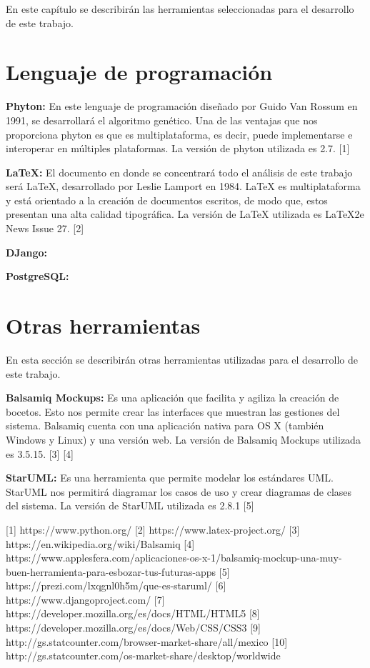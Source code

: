 \label{sec:seleccionHerramientas}
	
	En este capítulo se describirán las herramientas seleccionadas para el desarrollo de este trabajo. 
	
	\section{Lenguaje de programación}
		\textbf{Phyton:} En este lenguaje de programación diseñado por Guido Van Rossum en 1991, se desarrollará el algoritmo genético. Una de las ventajas que nos proporciona phyton es que es multiplataforma, es decir, puede implementarse e interoperar en múltiples plataformas. La versión de phyton utilizada es 2.7. [1] 
	
		\textbf{LaTeX:} El documento en donde se concentrará todo el análisis de este trabajo será LaTeX, desarrollado por Leslie Lamport en 1984. LaTeX es multiplataforma y está orientado a la creación de documentos escritos, de modo que, estos  presentan una alta calidad tipográfica. La versión de LaTeX utilizada es LaTeX2e News Issue 27. [2]
		
		\textbf{DJango:}
		
		\textbf{PostgreSQL:}
	
	\section{Otras herramientas}
		En esta sección se describirán otras herramientas utilizadas para el desarrollo de este trabajo.
		
		\textbf{Balsamiq Mockups:} Es una aplicación que facilita y agiliza la creación de bocetos. Esto nos permite crear las interfaces que muestran las gestiones del sistema. Balsamiq cuenta con una aplicación nativa para OS X (también Windows y Linux) y una versión web. La versión de Balsamiq Mockups utilizada es 3.5.15. [3] [4]
		
		\textbf{StarUML:} Es una herramienta que permite modelar los estándares UML. StarUML nos permitirá diagramar los casos de uso y crear diagramas de clases del sistema. La versión de StarUML utilizada es 2.8.1 [5]


	
	


	[1] https://www.python.org/
	[2] https://www.latex-project.org/
	[3] https://en.wikipedia.org/wiki/Balsamiq 
	[4] https://www.applesfera.com/aplicaciones-os-x-1/balsamiq-mockup-una-muy-buen-herramienta-para-esbozar-tus-futuras-apps
	[5] https://prezi.com/lxqgnl0h5m/que-es-staruml/
	[6] https://www.djangoproject.com/
	[7] https://developer.mozilla.org/es/docs/HTML/HTML5
	[8] https://developer.mozilla.org/es/docs/Web/CSS/CSS3
	[9] http://gs.statcounter.com/browser-market-share/all/mexico
	[10] http://gs.statcounter.com/os-market-share/desktop/worldwide